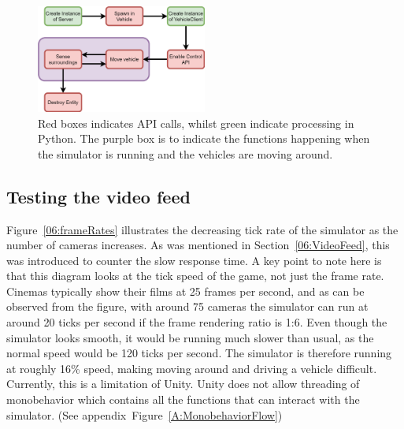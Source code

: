\begin{figure}[H]
\centering
    \includegraphics[width=0.5\textwidth]{08_Results/PythonLogicCycle.png}
    \caption[Python Logic Flow]{Red boxes indicates API calls, whilst green indicate processing in Python. The purple box is to indicate the functions happening when the simulator is running and the vehicles are moving around.} \label{08:PythonLogic}
\end{figure}




\subsection{Testing the video feed}
Figure~\ref{06:frameRates} illustrates the decreasing tick rate of the simulator as the number of cameras increases.  As was mentioned in Section~\ref{06:VideoFeed}, this was introduced to counter the slow response time. A key point to note here is that this diagram looks at the tick speed of the game, not just the frame rate. Cinemas typically show their films at 25 frames per second, and as can be observed from the figure, with around 75 cameras the simulator can run at around 20 ticks per second if the frame rendering ratio is 1:6. Even though the simulator looks smooth, it would be running much slower than usual, as the normal speed would be 120 ticks per second. The simulator is therefore running at roughly 16\% speed, making moving around and driving a vehicle difficult. Currently, this is a limitation of Unity. Unity does not allow threading of monobehavior which contains all the functions that can interact with the simulator. (See appendix~Figure~\ref{A:MonobehaviorFlow})

